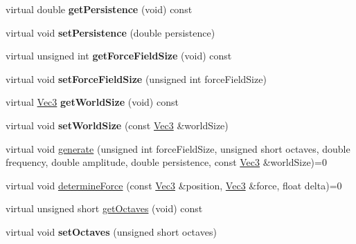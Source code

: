 \begin{DoxyCompactItemize}
virtual double {\bfseries get\+Persistence} (void) const
\item 
\mbox{\label{classPUForceFieldCalculationFactory_a154c8315e466a0ca8c852b65237d1336}} 
virtual void {\bfseries set\+Persistence} (double persistence)
\item 
\mbox{\label{classPUForceFieldCalculationFactory_aee1a3b079d8e89fa1e221f28846cee15}} 
virtual unsigned int {\bfseries get\+Force\+Field\+Size} (void) const
\item 
\mbox{\label{classPUForceFieldCalculationFactory_a708330ad638e9529996cd8d10efbae2b}} 
virtual void {\bfseries set\+Force\+Field\+Size} (unsigned int force\+Field\+Size)
\item 
\mbox{\label{classPUForceFieldCalculationFactory_ad5324f85be7d7cd71703ff9396c1b0b3}} 
virtual \hyperlink{classVec3}{Vec3} {\bfseries get\+World\+Size} (void) const
\item 
\mbox{\label{classPUForceFieldCalculationFactory_aeadcb997d282e73ee8e9b6326802f096}} 
virtual void {\bfseries set\+World\+Size} (const \hyperlink{classVec3}{Vec3} \&world\+Size)
\item 
virtual void \hyperlink{classPUForceFieldCalculationFactory_a8292a8ec09320a66c6ef130e98a7fd90}{generate} (unsigned int force\+Field\+Size, unsigned short octaves, double frequency, double amplitude, double persistence, const \hyperlink{classVec3}{Vec3} \&world\+Size)=0
\item 
virtual void \hyperlink{classPUForceFieldCalculationFactory_ab2ec33f744eccdd1301aa9c12a3f54f9}{determine\+Force} (const \hyperlink{classVec3}{Vec3} \&position, \hyperlink{classVec3}{Vec3} \&force, float delta)=0
\item 
virtual unsigned short \hyperlink{classPUForceFieldCalculationFactory_a6e6dd4ec99abdedab4178d91406fb374}{get\+Octaves} (void) const
\item 
\mbox{\label{classPUForceFieldCalculationFactory_af5b01655870b42667662a50803831cba}} 
virtual void {\bfseries set\+Octaves} (unsigned short octaves)
\item 

\end{DoxyCompactItemize}

